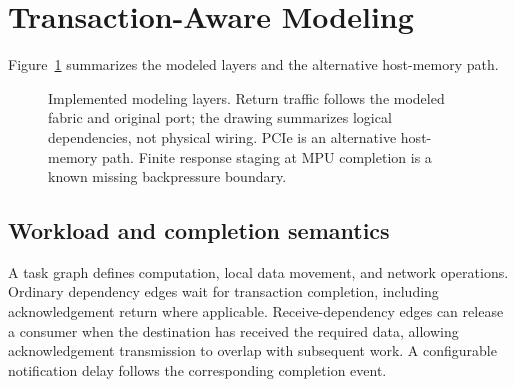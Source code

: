 \documentclass[conference]{IEEEtran}
\begin{document}
\section{Transaction-Aware Modeling}
Figure~\ref{fig:architecture} summarizes the modeled layers and the alternative host-memory path.
\begin{figure}[t]
\centering
{}
\caption{Implemented modeling layers. Return traffic follows the modeled fabric and original port; the drawing summarizes logical dependencies, not physical wiring. PCIe is an alternative host-memory path. Finite response staging at MPU completion is a known missing backpressure boundary.}
\label{fig:architecture}
\end{figure}

\subsection{Workload and completion semantics}
A task graph defines computation, local data movement, and network operations. Ordinary dependency edges wait for transaction completion, including acknowledgement return where applicable. Receive-dependency edges can release a consumer when the destination has received the required data, allowing acknowledgement transmission to overlap with subsequent work. A configurable notification delay follows the corresponding completion event.
\end{document}
